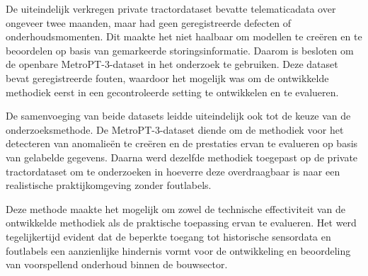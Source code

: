 De uiteindelijk verkregen private tractordataset bevatte telematicadata over ongeveer twee maanden, maar had geen geregistreerde defecten of onderhoudsmomenten. Dit maakte het niet haalbaar om modellen te creëren en te beoordelen op basis van gemarkeerde storingsinformatie. Daarom is besloten om de openbare MetroPT-3-dataset in het onderzoek te gebruiken. Deze dataset bevat geregistreerde fouten, waardoor het mogelijk was om de ontwikkelde methodiek eerst in een gecontroleerde setting te ontwikkelen en te evalueren.

De samenvoeging van beide datasets leidde uiteindelijk ook tot de keuze van de onderzoeksmethode. De MetroPT-3-dataset diende om de methodiek voor het detecteren van anomalieën te creëren en de prestaties ervan te evalueren op basis van gelabelde gegevens. Daarna werd dezelfde methodiek toegepast op de private tractordataset om te onderzoeken in hoeverre deze overdraagbaar is naar een realistische praktijkomgeving zonder foutlabels.

Deze methode maakte het mogelijk om zowel de technische effectiviteit van de ontwikkelde methodiek als de praktische toepassing ervan te evalueren. Het werd tegelijkertijd evident dat de beperkte toegang tot historische sensordata en foutlabels een aanzienlijke hindernis vormt voor de ontwikkeling en beoordeling van voorspellend onderhoud binnen de bouwsector.



